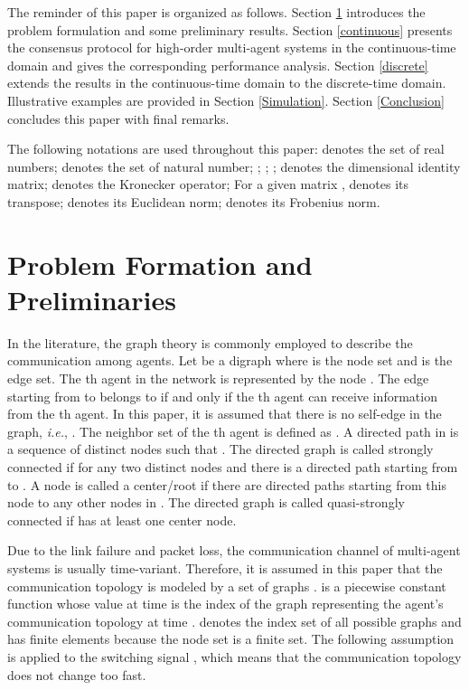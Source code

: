 \documentclass[12pt,draftcls,onecolumn]{IEEEtran}
\begin{document}
The reminder of this paper is organized as follows. Section {\ref{Problem}} introduces the problem formulation and some
preliminary results. Section {\ref{continuous}} presents the consensus protocol for high-order multi-agent systems in the continuous-time domain and gives the corresponding performance analysis. Section {\ref{discrete}} extends the results in the continuous-time domain to the discrete-time domain. Illustrative examples  are provided in Section {\ref{Simulation}}. Section {\ref{Conclusion}} concludes this paper
with final remarks.

The following notations are used throughout this paper:  denotes the set of real numbers;  denotes the set of natural number; ; ; ;  denotes the  dimensional
identity matrix;  denotes the Kronecker operator;
For a given matrix ,  denotes its transpose;  denotes its Euclidean norm;  denotes its Frobenius norm.



\section{Problem Formation and Preliminaries}\label{Problem}
In the literature, the graph theory is commonly employed to describe the communication among agents.
Let  be a digraph where  is the node
set and  is the edge set. The th agent in the network is
represented by the node . The edge  starting from  to  belongs to  if and only if the th agent can
receive information from the th agent. In this paper, it is assumed that there is no self-edge in the graph,
\emph{i.e.}, . The neighbor set of the th agent is defined
as . A directed path in  is a sequence of
distinct nodes  such that . The directed graph  is
called strongly connected if for any two distinct nodes  and  there is a directed path starting from  to . A node is called a center/root
if there are directed paths starting from this node to any other nodes in . The directed graph  is called
quasi-strongly connected if  has at least one center node.  

Due to the link failure and packet loss, the communication channel of multi-agent systems is usually time-variant. Therefore, it is assumed in this paper that the communication topology is modeled by a set of graphs .  is a piecewise constant function whose value at time  is the index of the graph representing the agent's communication topology at time .  denotes the index set of all possible graphs and  has finite elements because the node set  is a finite set. The following assumption is applied to the switching signal , which means that the communication topology does not change too fast.
\end{document}
